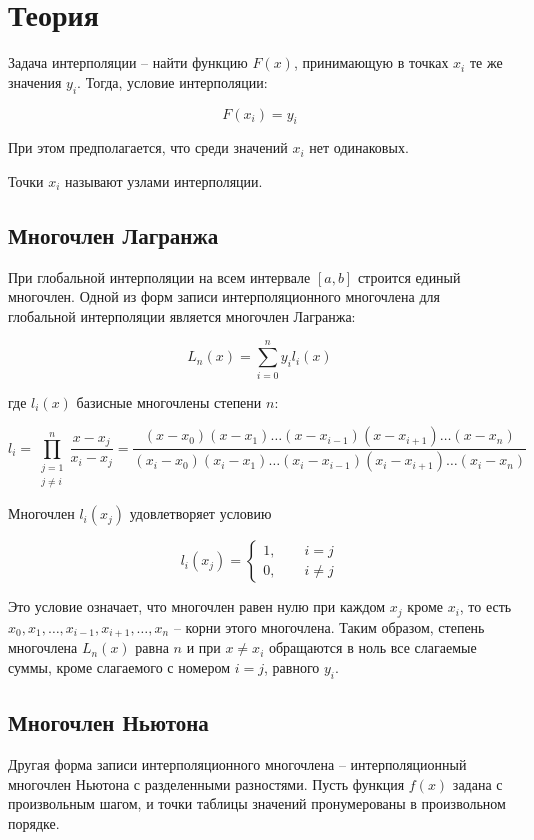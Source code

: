 \section*{Теория}
Задача интерполяции – найти функцию $F(x)$, принимающую в точках $x_i$
те же значения $y_i$. Тогда, условие интерполяции:

$$F(x_i) = y_i$$

При этом предполагается, что среди значений $x_i$ нет одинаковых.

Точки $x_i$ называют узлами интерполяции.

\subsection*{Многочлен Лагранжа}

При глобальной интерполяции на всем интервале $[a,b]$
строится единый многочлен.
Одной из форм записи интерполяционного многочлена для глобальной интерполяции
является многочлен Лагранжа:

$$L_n(x) = \sum_{i=0}^{n}y_i l_i(x)$$

где $l_i(x)$ базисные многочлены степени $n$:

$$l_i= \prod_{\substack{j=1 \\ j\neq i}}^n \frac{x - x_j}{x_i - x_j}=
\frac{(x-x_0)(x-x_1)\dots(x-x_{i-1})(x-x_{i+1})\dots(x-x_n)}
{(x_i-x_0)(x_i-x_1)\dots(x_i-x_{i-1})(x_i-x_{i+1})\dots(x_i-x_n)}$$

Многочлен $l_i(x_j)$ удовлетворяет условию

$$l_i(x_j) = \begin{cases}
    1,\qquad i = j \\
    0,\qquad i \neq j
\end{cases}$$

Это условие означает, что многочлен равен нулю при каждом $x_j$
кроме $x_i$, то есть $x_0,x_1,\dots, x_{i-1},x_{i+1},\dots,x_n$
– корни этого многочлена. Таким образом, степень
многочлена $L_n(x)$ равна $n$ и при $x \neq x_i$ обращаются в ноль
все слагаемые суммы, кроме слагаемого с номером $i = j$, равного $y_i$.

\subsection*{Многочлен Ньютона}

Другая форма записи интерполяционного многочлена – интерполяционный многочлен
Ньютона с разделенными разностями. Пусть функция $f(x)$ задана с произвольным
шагом, и точки таблицы значений пронумерованы в произвольном порядке.


